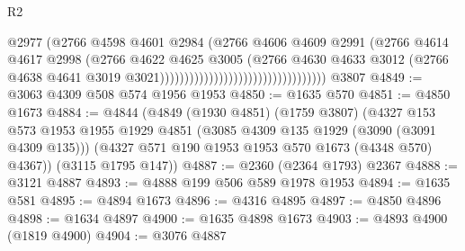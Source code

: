 \begin{lexlean}{R2}
\begin{coremodule}
                                                            @2977
                                                            (@2766
                                                              @4598
                                                              @4601
                                                              @2984
                                                              (@2766
                                                                @4606
                                                                @4609
                                                                @2991
                                                                (@2766
                                                                  @4614
                                                                  @4617
                                                                  @2998
                                                                  (@2766
                                                                    @4622
                                                                    @4625
                                                                    @3005
                                                                    (@2766
                                                                      @4630
                                                                      @4633
                                                                      @3012
                                                                      (@2766
                                                                        @4638
                                                                        @4641
                                                                        @3019
                                                                        @3021))))))))))))))))))))))))))))))))))
    @3807
@4849 := @3063 @4309 @508 @574 @1956 @1953
@4850 := @1635 @570
@4851 := @4850 @1673
@4884 := @4844
    (@4849
      (@1930 @4851)
      (@1759 @3807)
      (@4327
        @153
        @573
        @1953
        @1955
        @1929
        @4851
        (@3085 @4309 @135 @1929 (@3090 (@3091 @4309 @135)))
        (@4327 @571 @190 @1953 @1953 @570 @1673 (@4348 @570) @4367))
      (@3115 @1795 @147))
@4887 := @2360 (@2364 @1793) @2367
@4888 := @3121 @4887
@4893 := @4888 @199 @506 @589 @1978 @1953
@4894 := @1635 @581
@4895 := @4894 @1673
@4896 := @4316 @4895
@4897 := @4850 @4896
@4898 := @1634 @4897
@4900 := @1635 @4898 @1673
@4903 := @4893 @4900 (@1819 @4900)
@4904 := @3076 @4887

\end{coremodule}
\end{lexlean}

